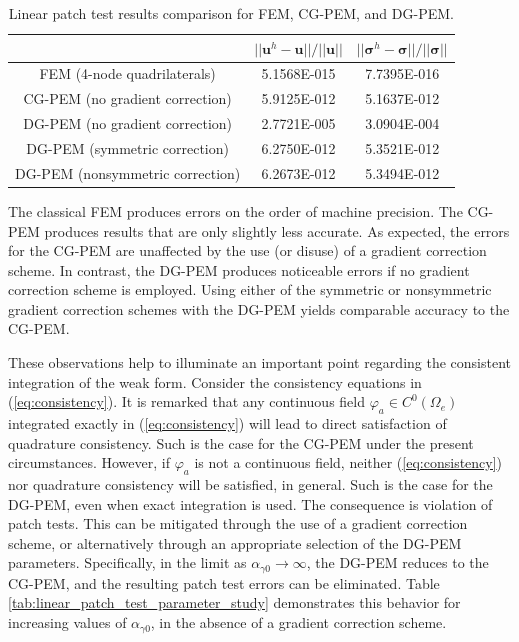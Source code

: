 \begin{table}[!ht]
  \begin{center}
    \begin{tabular}{| c || c | c |}
    \hline
           & $||\mathbf{u}^h - \mathbf{u}|| / ||\mathbf{u}||$ & $||\boldsymbol{\sigma}^h - \boldsymbol{\sigma}|| / ||\boldsymbol{\sigma}||$ \\ \hline \hline
    FEM (4-node quadrilaterals) & 5.1568E-015 & 7.7395E-016 \\ \hline
    CG-PEM (no gradient correction) & 5.9125E-012 & 5.1637E-012 \\ \hline
    DG-PEM (no gradient correction) & 2.7721E-005 & 3.0904E-004 \\ \hline
    DG-PEM (symmetric correction) & 6.2750E-012 & 5.3521E-012 \\ \hline
    DG-PEM (nonsymmetric correction) & 6.2673E-012 & 5.3494E-012 \\
    \hline
    \end{tabular}
    \caption{Linear patch test results comparison for FEM, CG-PEM, and DG-PEM.}
    \vspace{-5pt}
    \label{tab:linear_patch_test}
    \vspace{-25pt}
  \end{center}
\end{table}

The classical FEM produces errors on the order of machine precision. The CG-PEM produces results that are only slightly less accurate. As expected, the errors for the CG-PEM are unaffected by the use (or disuse) of a gradient correction scheme. In contrast, the DG-PEM produces noticeable errors if no gradient correction scheme is employed. Using either of the symmetric or nonsymmetric gradient correction schemes with the DG-PEM yields comparable accuracy to the CG-PEM.

These observations help to illuminate an important point regarding the consistent integration of the weak form. Consider the consistency equations in (\ref{eq:consistency}). It is remarked that any continuous field $\varphi_a \in C^0 (\Omega_e)$ integrated exactly in (\ref{eq:consistency}) will lead to direct satisfaction of quadrature consistency. Such is the case for the CG-PEM under the present circumstances. However, if $\varphi_a$ is not a continuous field, neither (\ref{eq:consistency}) nor quadrature consistency will be satisfied, in general. Such is the case for the DG-PEM, even when exact integration is used. The consequence is violation of patch tests. This can be mitigated through the use of a gradient correction scheme, or alternatively through an appropriate selection of the DG-PEM parameters. Specifically, in the limit as $\alpha_{\gamma0} \rightarrow \infty$, the DG-PEM reduces to the CG-PEM, and the resulting patch test errors can be eliminated. Table \ref{tab:linear_patch_test_parameter_study} demonstrates this behavior for increasing values of $\alpha_{\gamma0}$, in the absence of a gradient correction scheme.

